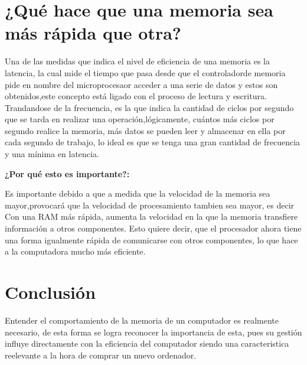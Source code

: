 \documentclass{article}
\begin{document}
\section{¿Qué hace que una memoria sea más rápida que otra?} \label{contenido}


Una de las medidas que indica el nivel de eficiencia de una memoria es la latencia, la cual mide el tiempo que pasa desde que el controladorde memoria pide en nombre del microprocesaor acceder a una serie de datos y estos son obtenidos,este concepto está ligado con el proceso de lectura y escritura.
Trandandose de la frecuencia, es la que  indica la cantidad de ciclos por segundo que se tarda en realizar una operación,lógicamente, cuántos más ciclos por segundo realice la memoria, más datos se pueden leer y almacenar
en ella por cada segundo de trabajo, lo ideal es  que se tenga una gran cantidad de frecuencia y una mínima en latencia.
\cite{knuthwebsite}
\cite{stallings}


\textbf{¿Por qué esto es importante?:}

Es importante debido a que a medida que la velocidad de la memoria sea mayor,provocará que la velocidad de procesamiento tambien sea mayor, es decir
Con una RAM más rápida, aumenta la velocidad en la que la memoria transfiere información a otros componentes. Esto quiere decir, que el procesador ahora tiene una forma igualmente rápida de comunicarse con otros componentes, lo que hace a la computadora mucho más eficiente.



\section{Conclusión} \label{conclulsion}

Entender el comportamiento de la memoria de un computador es realmente necesario, de esta forma se logra reconocer la importancia de esta, pues su gestión influye directamente con la eficiencia del computador siendo una caracteristica reelevante a la hora de comprar un nuevo ordenador.  



\end{document}
